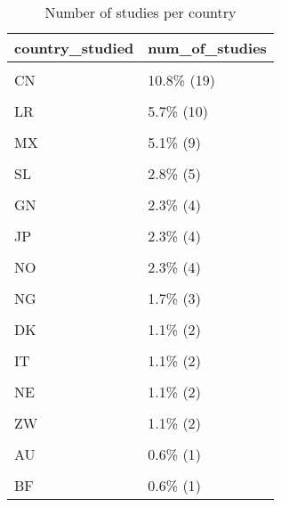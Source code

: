 \documentclass[
]{article}
\begin{document}
\begin{table}[H]

\caption{\label{tab:unnamed-chunk-14}Number of studies per country}
\centering
\fontsize{7}{9}\selectfont
\begin{tabular}[t]{ll}
\toprule
country\_studied & num\_of\_studies\\
\midrule
\cellcolor{gray!6}{US} & \cellcolor{gray!6}{21.6\%  (38)}\\
CN & 10.8\%  (19)\\
\cellcolor{gray!6}{CA} & \cellcolor{gray!6}{6.2\%  (11)}\\
LR & 5.7\%  (10)\\
\cellcolor{gray!6}{HK} & \cellcolor{gray!6}{5.1\%   (9)}\\
\addlinespace
MX & 5.1\%   (9)\\
\cellcolor{gray!6}{GB} & \cellcolor{gray!6}{2.8\%   (5)}\\
SL & 2.8\%   (5)\\
\cellcolor{gray!6}{BR} & \cellcolor{gray!6}{2.3\%   (4)}\\
GN & 2.3\%   (4)\\
\addlinespace
\cellcolor{gray!6}{HT} & \cellcolor{gray!6}{2.3\%   (4)}\\
JP & 2.3\%   (4)\\
\cellcolor{gray!6}{NL} & \cellcolor{gray!6}{2.3\%   (4)}\\
NO & 2.3\%   (4)\\
\cellcolor{gray!6}{IL} & \cellcolor{gray!6}{1.7\%   (3)}\\
\addlinespace
NG & 1.7\%   (3)\\
\cellcolor{gray!6}{TW} & \cellcolor{gray!6}{1.7\%   (3)}\\
DK & 1.1\%   (2)\\
\cellcolor{gray!6}{IN} & \cellcolor{gray!6}{1.1\%   (2)}\\
IT & 1.1\%   (2)\\
\addlinespace
\cellcolor{gray!6}{LY} & \cellcolor{gray!6}{1.1\%   (2)}\\
NE & 1.1\%   (2)\\
\cellcolor{gray!6}{SG} & \cellcolor{gray!6}{1.1\%   (2)}\\
ZW & 1.1\%   (2)\\
\cellcolor{gray!6}{AO} & \cellcolor{gray!6}{0.6\%   (1)}\\
\addlinespace
AU & 0.6\%   (1)\\
\cellcolor{gray!6}{BE} & \cellcolor{gray!6}{0.6\%   (1)}\\
BF & 0.6\%   (1)\\

\end{tabular}
\end{table}
\end{document}
